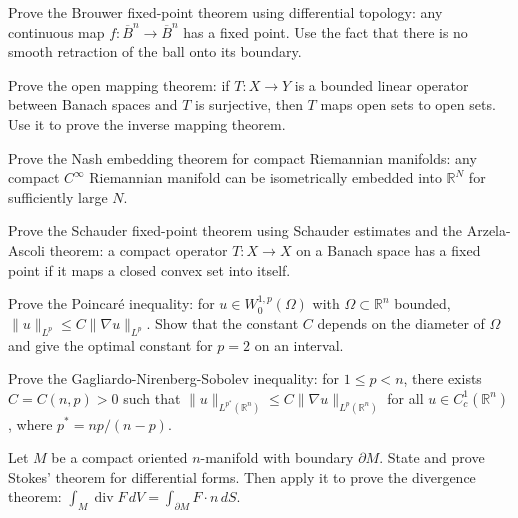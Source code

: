 \documentclass[12pt,a4paper]{exam}
\begin{document}
\begin{questions}

\question[3]
Prove the Brouwer fixed-point theorem using differential topology: any continuous map $f: \overline{B}^n \to \overline{B}^n$ has a fixed point. Use the fact that there is no smooth retraction of the ball onto its boundary.

\vspace{0.3cm}

\question[3]
Prove the open mapping theorem: if $T: X \to Y$ is a bounded linear operator between Banach spaces and $T$ is surjective, then $T$ maps open sets to open sets. Use it to prove the inverse mapping theorem.

\vspace{0.3cm}

\question[5]
Prove the Nash embedding theorem for compact Riemannian manifolds: any compact $C^\infty$ Riemannian manifold can be isometrically embedded into $\mathbb{R}^N$ for sufficiently large $N$.

\vspace{0.3cm}

\question[2]
Prove the Schauder fixed-point theorem using Schauder estimates and the Arzela-Ascoli theorem: a compact operator $T: X \to X$ on a Banach space has a fixed point if it maps a closed convex set into itself.

\vspace{0.3cm}

\question[5]
Prove the Poincar\'e inequality: for $u \in W_0^{1,p}(\Omega)$ with $\Omega \subset \mathbb{R}^n$ bounded, $\|u\|_{L^p} \leq C \|\nabla u\|_{L^p}$. Show that the constant $C$ depends on the diameter of $\Omega$ and give the optimal constant for $p=2$ on an interval.

\vspace{0.3cm}

\question[3]
Prove the Gagliardo-Nirenberg-Sobolev inequality: for $1 \leq p < n$, there exists $C = C(n,p) > 0$ such that $\|u\|_{L^{p^*}(\mathbb{R}^n)} \leq C \|\nabla u\|_{L^p(\mathbb{R}^n)}$ for all $u \in C_c^1(\mathbb{R}^n)$, where $p^* = np/(n-p)$.

\vspace{0.3cm}

\question[4]
Let $M$ be a compact oriented $n$-manifold with boundary $\partial M$. State and prove Stokes' theorem for differential forms. Then apply it to prove the divergence theorem: $\int_M \operatorname{div} F \, dV = \int_{\partial M} F \cdot n \, dS$.


\end{questions}
\end{document}
